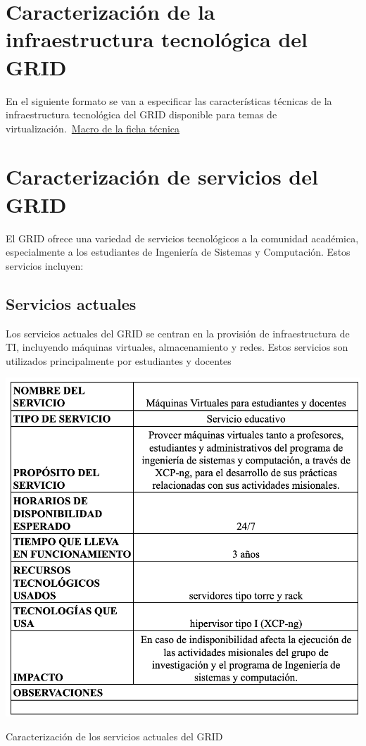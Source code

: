 \section{Caracterización de la infraestructura tecnológica del GRID}
En el siguiente formato se van a especificar las características técnicas de la infraestructura tecnológica del GRID disponible para temas de virtualización.\ \href{https://docs.google.com/spreadsheets/d/14NBv72ucVTrLqGIldYdIsjdBGt3QlgwcblcVRis-DaQ/edit?usp=sharing}{Macro de la ficha técnica}


\section{Caracterización de servicios del GRID}
El GRID ofrece una variedad de servicios tecnológicos a la comunidad académica, especialmente a los estudiantes de Ingeniería de Sistemas y Computación. Estos servicios incluyen:

\subsection{Servicios actuales}
Los servicios actuales del GRID se centran en la provisión de infraestructura de TI, incluyendo máquinas virtuales, almacenamiento y redes. Estos servicios son utilizados principalmente por estudiantes y docentes

\begin{table}[H]
    \centering
    \includegraphics[width=\textwidth]{tablas-images/cp1/servicios-actuales/servicios-actuales.png}
    \caption{Caracterización de los servicios actuales del GRID}\label{tab:servicios-actuales}
\end{table}

